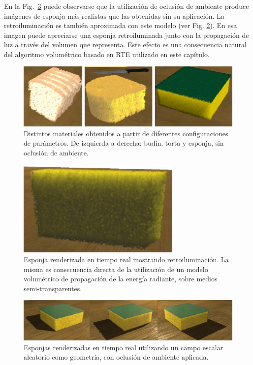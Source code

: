 En la Fig.~\ref{fg:sponges} puede observarse que la utilización de oclusión de ambiente produce imágenes de esponja más realistas que las obtenidas sin su aplicación.
La retroiluminación es también aproximada con este modelo (ver Fig. \ref{fg:fig7}).
En esa imagen puede apreciarse una esponja retroiluminada junto con la propagación de luz a través del volumen que representa.
Este efecto es una consecuencia natural del algoritmo volumétrico basado en RTE utilizado en este capítulo.

\begin{figure}[htb!]
  \centerline{\includegraphics[width=13cm]{fig6}}
  \caption[Budín, torta y esponja renderizados]{Distintos materiales obtenidos a partir de diferentes configuraciones de parámetros. De izquierda a derecha: budín, torta y esponja, sin oclusión de ambiente. }
  \label{fg:fig6}

\end{figure}

\begin{figure}[htb!]
  \centerline{\includegraphics[width=8cm]{fig7}}
  \caption[Esponja retroiluminada.]{Esponja renderizada en tiempo real mostrando retroiluminación. La misma es consecuencia directa de la utilización de un modelo volumétrico de propagación de la energía radiante, sobre medios semi-transparentes.}
  \label{fg:fig7}
\end{figure}


\begin{figure}
  \centerline{\includegraphics[width=13cm]{figures/sponges}}
  \caption{Esponjas renderizadas en tiempo real utilizando un campo escalar aleatorio como geometría, con oclusión de ambiente aplicada.}
  \label{fg:sponges}
\end{figure}

